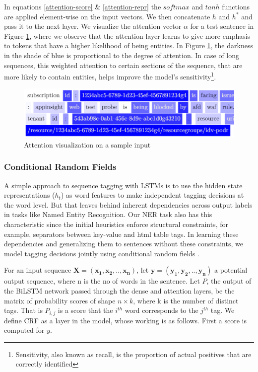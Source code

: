 In equations \ref{attention-score} \& \ref{attention-repr} the $softmax$ and $tanh$ functions are applied element-wise on the input vectors. We then concatenate $h$ and $h^*$ and pass it to the next layer. We visualize the attention vector $\alpha$ for a test sentence in Figure \ref{attention-viz}, where we observe that the attention layer learns to give more emphasis to tokens that have a higher likelihood of being entities. In Figure \ref{attention-viz}, the darkness in the shade of blue is proportional to the degree of attention. In case of long sequences, this weighted attention to certain sections of the sequence, that are more likely to contain entities, helps improve the model's sensitivity\footnote{Sensitivity, also known as recall, is the proportion of actual positives that are correctly identified}.

\begin{figure}%
\includegraphics[width=\linewidth]{Figures/attention_viz.png}
\vspace{-12pt}
\caption{Attention visualization on a sample input}
\label{attention-viz}
\vspace{-6pt}
\end{figure}

\subsubsection{\textbf{Conditional Random Fields}}
A simple approach to sequence tagging with LSTMs is to use the hidden state representations ($h_t$) as word features to make independent tagging decisions at the word level. But that leaves behind inherent dependencies across output labels in tasks like Named Entity Recognition. Our NER task also has this characteristic since the initial \softner{} heuristics enforce structural constraints, for example, separators between key-value and html table tags. In learning these dependencies and generalizing them to sentences without these constraints, we model tagging decisions jointly using conditional random fields 
\cite{lafferty2001conditional}.

For an input sequence $\boldsymbol{X = (x_1, x_2, .., x_n)}$, let $\boldsymbol{y = (y_1, y_2, .., y_n)}$ a potential output sequence, where n is the no of words in the sentence. Let $P$, the output of the BiLSTM network passed through the dense and attention layers, be the matrix of probability scores of shape $n \times k$, where k is the number of distinct tags. That is $P_{i,j}$ is a score that the $i^{th}$ word corresponds to the $j^{th}$ tag. We define CRF as a layer in the model, whose working is as follows. First a score is computed for $y$.

